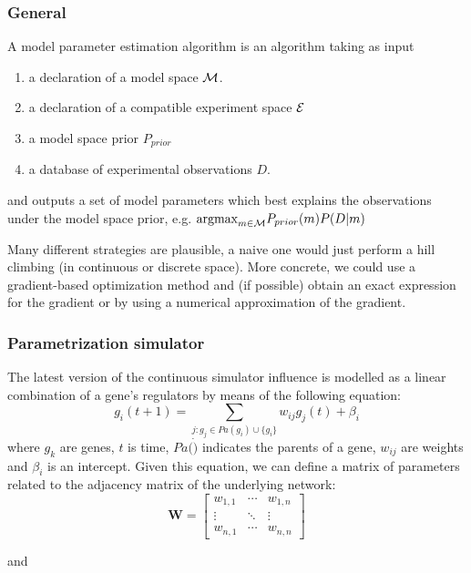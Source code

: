 \documentclass{article}
\begin{document}
\subsubsection{General}
A model parameter estimation algorithm is an algorithm taking as input
\begin{enumerate}
\item a declaration of a model space $\mathcal{M}$.
\item a declaration of a compatible experiment space $\mathcal{E}$
\item a model space prior $P_{prior}$
\item a database of experimental observations $D$.
\end{enumerate}

and outputs a set of model parameters which best explains the observations under the model space prior, e.g.
$\hbox{argmax}_{m\in\mathcal{M}} P_{prior}(m)P(D|m)$

Many different strategies are plausible, a naive one would just perform a hill climbing (in continuous or discrete space). More concrete, we could use a gradient-based optimization method and (if possible)
obtain an exact expression for the gradient or by using a numerical approximation of the gradient.
\subsubsection{Parametrization simulator}\label{sec:param_sim}
The latest version of the continuous simulator influence is modelled as a linear combination of a gene's regulators by means of the following equation:
\begin{equation}
 g_i(t+1) = \sum_{j : g_j \in Pa(g_i) \cup \{g_i\} } w_{ij}g_j(t) + \beta_{i}
 \label{eq:cont_sim}
\end{equation}
where $g_k$ are genes, $t$ is time, $Pa(\dot)$ indicates the parents of a gene, $w_{ij}$ are weights and $\beta_i$ is an intercept. 
Given this equation, we can define a matrix of parameters related to the adjacency matrix of the underlying network:
\begin{equation}
\mathbf{W} = \begin{bmatrix} 
w_{1,1} &\cdots & w_{1,n}\\
\vdots & \ddots & \vdots \\
w_{n,1} & \cdots & w_{n,n} 
      \end{bmatrix}
\end{equation}


and
\end{document}

